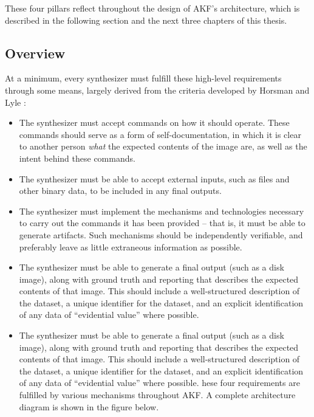 These four pillars reflect throughout the design of AKF's architecture,
which is described in the following section and the next three chapters
of this thesis.

\subsection{Overview}\label{overview}

At a minimum, every synthesizer must fulfill these high-level
requirements through some means, largely derived from the criteria
developed by Horsman and Lyle
\cite{horsmanDatasetConstructionChallenges2021}:

\begin{itemize}
\item
  The synthesizer must accept commands on how it should operate. These
  commands should serve as a form of self-documentation, in which it is
  clear to another person \emph{what} the expected contents of the image
  are, as well as the intent behind these commands.
\item
  The synthesizer must be able to accept external inputs, such as files
  and other binary data, to be included in any final outputs.
\item
  The synthesizer must implement the mechanisms and technologies
  necessary to carry out the commands it has been provided -- that is,
  it must be able to generate artifacts. Such mechanisms should be
  independently verifiable, and preferably leave as little extraneous
  information as possible.
\item
  The synthesizer must be able to generate a final output (such as a
  disk image), along with ground truth and reporting that describes the
  expected contents of that image. This should include a well-structured
  description of the dataset, a unique identifier for the dataset, and
  an explicit identification of any data of ``evidential value'' where
  possible.
\item
  The synthesizer must be able to generate a final output (such as a
  disk image), along with ground truth and reporting that describes the
  expected contents of that image. This should include a well-structured
  description of the dataset, a unique identifier for the dataset, and
  an explicit identification of any data of ``evidential value'' where
  possible. hese four requirements are fulfilled by various mechanisms
  throughout AKF. A complete architecture diagram is shown in the figure
  below.
\end{itemize}

